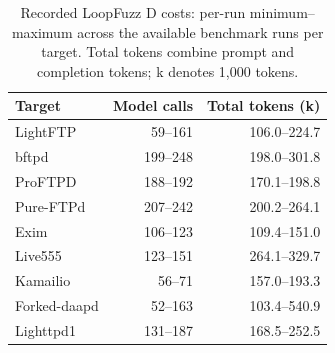 \begin{table}[t]
\centering\small
\caption{Recorded LoopFuzz D costs: per-run minimum--maximum across the available benchmark runs per target. Total tokens combine prompt and completion tokens; k denotes 1,000 tokens.}
\label{tab:observed_costs}
\begin{tabular}{lrr}
\toprule
Target & Model calls & Total tokens (k) \\
\midrule
LightFTP & 59--161 & 106.0--224.7 \\
bftpd & 199--248 & 198.0--301.8 \\
ProFTPD & 188--192 & 170.1--198.8 \\
Pure-FTPd & 207--242 & 200.2--264.1 \\
Exim & 106--123 & 109.4--151.0 \\
Live555 & 123--151 & 264.1--329.7 \\
Kamailio & 56--71 & 157.0--193.3 \\
Forked-daapd & 52--163 & 103.4--540.9 \\
Lighttpd1 & 131--187 & 168.5--252.5 \\
\bottomrule
\end{tabular}
\end{table}
